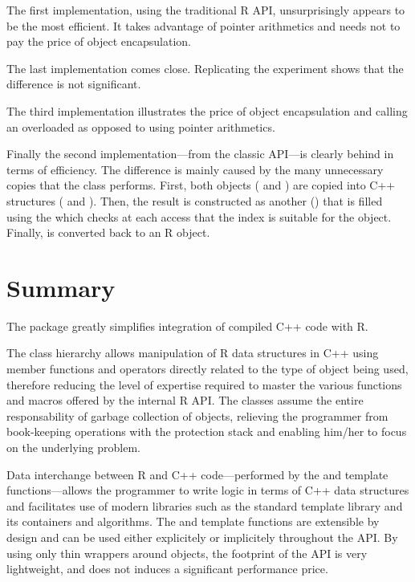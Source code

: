 The first implementation, using the traditional R API, unsurprisingly 
appears to be the most efficient. It takes advantage of pointer 
arithmetics and needs not to pay the price of object encapsulation. 

The last implementation comes close. Replicating the experiment
shows that the difference is not significant. 

The third implementation illustrates the price of object encapsulation
and calling an overloaded  as opposed to using 
pointer arithmetics.

Finally the second implementation---from the classic  API---is
clearly behind in terms of efficiency. The difference is mainly 
caused by the many unnecessary copies that the 
class performs. First, both objects ( and )
are copied into C++ structures ( and ). 
Then, the result is constructed as another 
() that is filled using the  which checks
at each access that the index is suitable for the object. Finally, 
is converted back to an R object. 

\section{Summary}

The  package greatly simplifies integration of compiled C++ code
with R. 

The class hierarchy allows manipulation of R data structures in C++ 
using member functions and operators directly related to the type
of object being used, therefore reducing the level of expertise
required to master the various functions and macros offered by the
internal R API. The classes assume the entire 
responsability of garbage collection of objects, relieving the 
programmer from book-keeping operations with the protection stack 
and enabling him/her to focus on the underlying problem. 

Data interchange between R and C++ code---performed by the  and
 template functions---allows the programmer to write logic in terms
of C++ data structures and facilitates use of modern libraries such as the
standard template library and its containers and algorithms. The
 and  template functions are extensible by design and
can be used either explicitely or implicitely throughout the API.
By using only thin wrappers around  objects, 
the footprint of the  API is very lightweight, and does not 
induces a significant performance price. 

